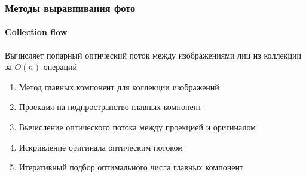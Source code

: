 \documentclass{beamer}
\begin{document}
  \begin{frame}
  	  \frametitle{Методы выравнивания фото}
  	  \framesubtitle{Collection flow}
  	  Вычисляет попарный оптический поток между изображениями лиц из коллекции за $O(n)$ операций
	  \begin{enumerate}
	  	\item Метод главных компонент для коллекции изображений
	  	\item Проекция на подпространство главных компонент
	  	\item Вычисление оптического потока между проекцией и оригиналом
	  	\item Искривление оригинала оптическим потоком
	  	\item Итеративный подбор оптимального числа главных компонент
	  \end{enumerate}
  \end{frame}
  
\end{document}
